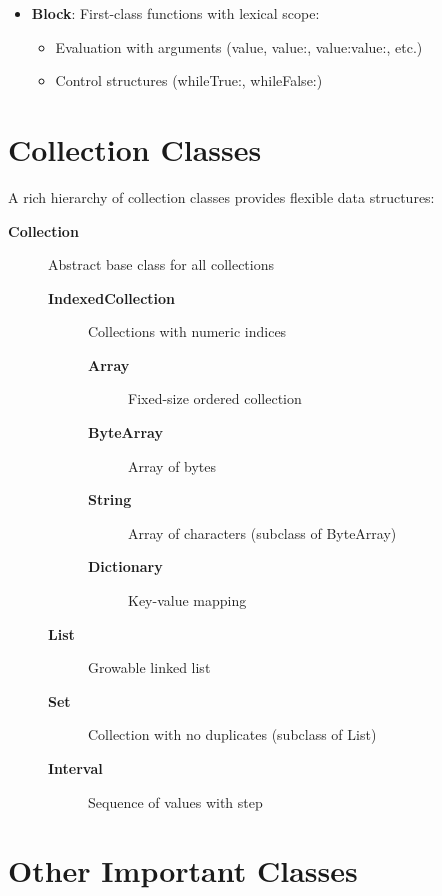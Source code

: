 \documentclass[12pt,a4paper]{report}
\begin{document}
\begin{itemize}
    \item \textbf{Block}: First-class functions with lexical scope:
    \begin{itemize}
        \item Evaluation with arguments (value, value:, value:value:, etc.)
        \item Control structures (whileTrue:, whileFalse:)
    \end{itemize}
\end{itemize}

\section{Collection Classes}

A rich hierarchy of collection classes provides flexible data structures:

\begin{description}
    \item[\textbf{Collection}] Abstract base class for all collections
    \begin{description}
        \item[\textbf{IndexedCollection}] Collections with numeric indices
        \begin{description}
            \item[\textbf{Array}] Fixed-size ordered collection
            \item[\textbf{ByteArray}] Array of bytes
            \item[\textbf{String}] Array of characters (subclass of ByteArray)
            \item[\textbf{Dictionary}] Key-value mapping
        \end{description}
        \item[\textbf{List}] Growable linked list
        \item[\textbf{Set}] Collection with no duplicates (subclass of List)
        \item[\textbf{Interval}] Sequence of values with step
    \end{description}
\end{description}

\section{Other Important Classes}
\end{document}
